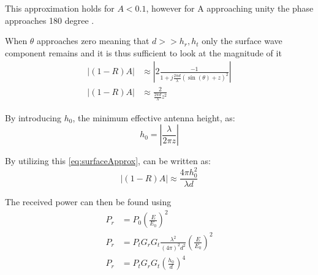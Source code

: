 This approximation holds for $A<0.1$, however for A approaching unity the phase approaches 180 degree \citep{Bullington}. 

When $\theta$ approaches zero meaning that $d >> h_r,h_t$ only the surface wave component remains and it is thus sufficient to look at the magnitude of it \citep{Chong}
\begin{align}
|(1-R)A| &\approx \left|2 \frac{-1}{1+j\frac{2\pi d}{\lambda}\left(\sin(\theta)+z\right)^2} \right| \\
|(1-R)A| &\approx \frac{2}{\frac{2\pi d}{\lambda}z^2} \label{eq:surfaceApprox}
\end{align}

By introducing $h_0$, the minimum effective antenna height, as:
\begin{equation}
h_0=\left| \frac{\lambda}{2\pi z} \right|
\end{equation} 
\begin{where}
\end{where}

By utilizing this \autoref{eq:surfaceApprox}, can be written as:
\begin{equation}
|(1-R)A| \approx \frac{4 \pi h_0^2}{\lambda d}
\end{equation}

The received power can then be found using \citep{Chong}
\begin{align}
P_r&=P_0 \left(\frac{E}{E_0}\right)^2 \\
P_r&=P_tG_rG_t\frac{\lambda^2}{(4\pi )^2 d^2} \left(\frac{E}{E_0}\right)^2\\
P_r&=P_tG_rG_t\left(\frac{h_0}{d}\right)^4
\end{align}
\begin{where}
\end{where}


















